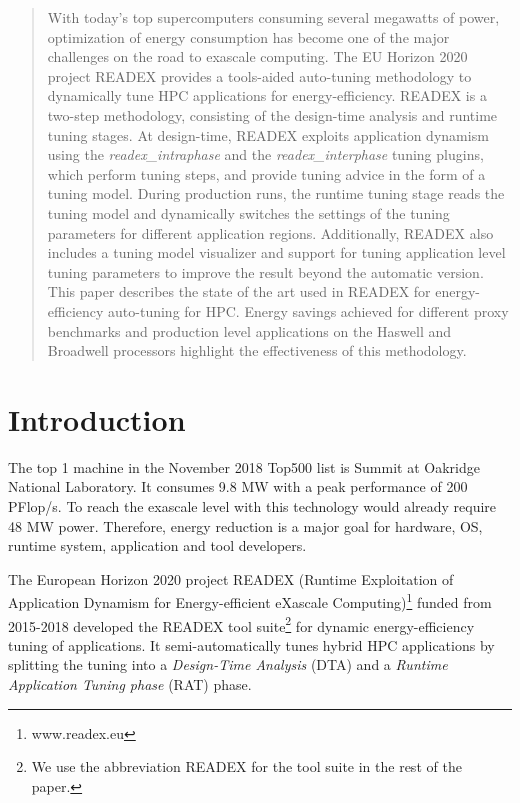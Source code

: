 \documentclass[runningheads]{llncs}
\begin{document}
\begin{abstract}
With today's top supercomputers consuming several mega\-watts of power, optimization of energy consumption has become one of the major challenges on the road to exascale computing.
The EU Horizon 2020 project READEX provides a tools-aided auto-tuning methodology to dynamically tune HPC applications for energy-efficiency. READEX is a two-step methodology, consisting of the design-time analysis and runtime tuning stages. At design-time, READEX exploits application dynamism using the \textit{readex\_intraphase} and the \textit{readex\_interphase} tuning plugins, which perform tuning steps, and provide tuning advice in the form of a tuning model. During production runs, the runtime tuning stage reads the tuning model and dynamically switches the settings of the tuning parameters for different application regions. Additionally, READEX also includes a tuning model visualizer and support for tuning application level tuning parameters to improve the result beyond the automatic version. This paper describes the state of the art used in READEX for energy-efficiency auto-tuning for HPC. Energy savings achieved for different proxy benchmarks and production level applications on the Haswell and Broadwell processors highlight the effectiveness of this methodology.

\end{abstract}

\section{Introduction} \label{sec:introduction}

The top 1 machine in the November 2018 Top500 list is Summit at Oakridge National Laboratory. It consumes 9.8 MW with a peak performance of 200 PFlop/s. To reach the exascale level with this technology would already require 48 MW power. Therefore, energy reduction is a major goal for hardware, OS, runtime system, application and tool developers. 

The European Horizon 2020 project READEX (Runtime Exploitation of Application Dynamism for Energy-efficient eXascale Computing)\footnote{www.readex.eu} funded from 2015-2018 developed the READEX tool suite\footnote{We use the abbreviation READEX for the tool suite in the rest of the paper.} for dynamic energy-efficiency tuning of applications. It semi-automatically tunes hybrid HPC applications by splitting the tuning into a \textit{Design-Time Analysis} (DTA) and a \textit{Runtime Application Tuning phase} (RAT) phase. 
\end{document}
